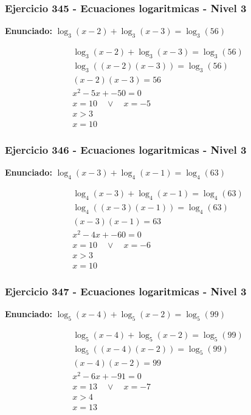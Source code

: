 \documentclass[12pt,a4paper]{article}
\begin{document}
\subsubsection*{Ejercicio 345 - Ecuaciones logaritmicas - Nivel 3}
\textbf{Enunciado:} \(\log_{3}\left(x-2\right)+\log_{3}\left(x-3\right)=\log_{3}\left(56\right)\)

\[
\begin{aligned}
\log_{3}\left(x-2\right)+\log_{3}\left(x-3\right)=\log_{3}\left(56\right)\\
\log_{3}\left((x-2)(x-3)\right)=\log_{3}\left(56\right)\\
(x-2)(x-3)=56\\
x^2-5x+-50=0\\
x=10\quad \vee\quad x=-5\\
x>3\\
\boxed{x=10}
\end{aligned}
\]


\subsubsection*{Ejercicio 346 - Ecuaciones logaritmicas - Nivel 3}
\textbf{Enunciado:} \(\log_{4}\left(x-3\right)+\log_{4}\left(x-1\right)=\log_{4}\left(63\right)\)

\[
\begin{aligned}
\log_{4}\left(x-3\right)+\log_{4}\left(x-1\right)=\log_{4}\left(63\right)\\
\log_{4}\left((x-3)(x-1)\right)=\log_{4}\left(63\right)\\
(x-3)(x-1)=63\\
x^2-4x+-60=0\\
x=10\quad \vee\quad x=-6\\
x>3\\
\boxed{x=10}
\end{aligned}
\]


\subsubsection*{Ejercicio 347 - Ecuaciones logaritmicas - Nivel 3}
\textbf{Enunciado:} \(\log_{5}\left(x-4\right)+\log_{5}\left(x-2\right)=\log_{5}\left(99\right)\)

\[
\begin{aligned}
\log_{5}\left(x-4\right)+\log_{5}\left(x-2\right)=\log_{5}\left(99\right)\\
\log_{5}\left((x-4)(x-2)\right)=\log_{5}\left(99\right)\\
(x-4)(x-2)=99\\
x^2-6x+-91=0\\
x=13\quad \vee\quad x=-7\\
x>4\\
\boxed{x=13}
\end{aligned}
\]
\end{document}
